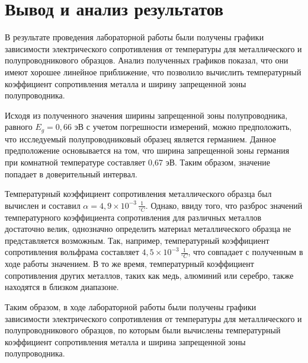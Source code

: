 \section{Вывод и анализ результатов}
В результате проведения лабораторной работы были получены графики зависимости электрического сопротивления от температуры для металлического и полупроводникового образцов. Анализ полученных графиков показал, что они имеют хорошее линейное приближение, что позволило вычислить температурный коэффициент сопротивления металла и ширину запрещенной зоны полупроводника.

Исходя из полученного значения ширины запрещенной зоны полупроводника, равного $E_g = 0,66 \text{ эВ}$ с учетом погрешности измерений, можно предположить, что исследуемый полупроводниковый образец является германием. Данное предположение основывается на том, что ширина запрещенной зоны германия при комнатной температуре составляет 0,67 эВ. Таким образом, значение попадает в доверительный интервал.

Температурный коэффициент сопротивления металлического образца был вычислен и составил $\alpha = 4,9 \times 10^{-3} \, \frac{1}{^\circ C}$. Однако, ввиду того, что разброс значений температурного коэффициента сопротивления для различных металлов достаточно велик, однозначно определить материал металлического образца не представляется возможным. Так, например, температурный коэффициент сопротивления вольфрама составляет $4,5 \times 10^{-3} \, \frac{1}{^\circ C}$, что совпадает с полученным в ходе работы значением. В то же время, температурный коэффициент сопротивления других металлов, таких как медь, алюминий или серебро, также находятся в близком диапазоне.

Таким образом, в ходе лабораторной работы были получены графики зависимости электрического сопротивления от температуры для металлического и полупроводникового образцов, по которым были вычислены температурный коэффициент сопротивления металла и ширина запрещенной зоны полупроводника.
